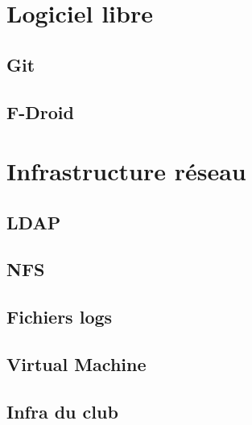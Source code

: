 \documentclass[french, a4paper, 12pt, titlepage]{article}
\begin{document}
\newpage
\section{Logiciel libre}
	
  \subsection{Git}
    
  \subsection{F-Droid}
    
    
\newpage
\section{Infrastructure réseau}
  \subsection{LDAP}
    
  \subsection{NFS}
    
  \subsection{Fichiers logs}
    
  \subsection{Virtual Machine}
    
  \subsection{Infra du club}
    
\end{document}

